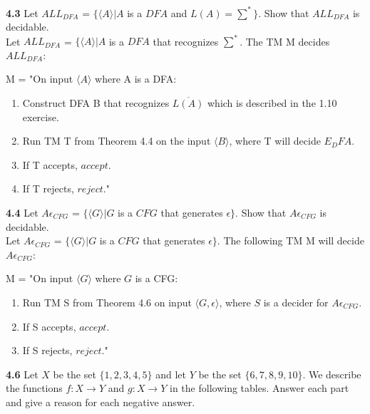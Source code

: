 \documentclass[12pt]{article}
\begin{document}
\pagebreak
\textbf{4.3} Let $ALL_{DFA}$ = $\{ \langle A \rangle | A$ is a $DFA$ and $L(A) = \sum^*\}$.
Show that $ALL_{DFA}$ is decidable. \\

Let $ALL_{DFA}$ = $\{ \langle A \rangle | A$ is a $DFA$ that recognizes $\sum^*$. The TM M
decides $ALL_{DFA}$:

M = "On input $\langle A \rangle$ where A is a DFA:
\begin{enumerate}
	\item Construct DFA B that recognizes $\overline{L(A)}$ which is described in the 1.10 exercise.
	\item Run TM T from Theorem 4.4 on the input  $\langle B \rangle$, where T will decide $E_DFA$.
	\item If T accepts, $accept$.
	\item If T rejects, $reject$."
\end{enumerate}

\textbf{4.4} Let $A\epsilon_{CFG}$ = $\{ \langle G \rangle | G$ is a $CFG$ that generates $\epsilon \}$.
Show that $A\epsilon_{CFG}$ is decidable. \\

Let $A\epsilon_{CFG}$ = $\{ \langle G \rangle | G$ is a $CFG$ that generates $\epsilon \}$.
The following TM M will decide $A\epsilon_{CFG}$:

M = "On input $\langle G \rangle$ where $G$ is a CFG:
\begin{enumerate}
	\item Run TM S from Theorem 4.6 on input $\langle G, \epsilon \rangle$, where $S$ is a decider for $A\epsilon_{CFG}$.
	\item If S accepts, $accept$.
	\item If S rejects, $reject$."
\end{enumerate}

\pagebreak
\textbf{4.6} Let $X$ be the set $\{1, 2, 3, 4 ,5 \}$ and let $Y$ be the set $\{6, 7, 8, 9, 10 \}$.
We describe the functions $f: X \rightarrow Y$ and $g: X \rightarrow Y$ in the following tables.
Answer each part and give a reason for each negative answer. \\
\end{document}
